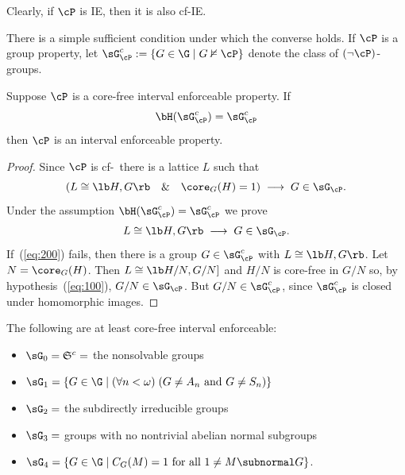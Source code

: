 \begin{frame}[label=IEPropsConverseLemma]{}
Clearly, if $\cP$ is IE, then it is also cf-IE.
\vskip4mm

There is a simple sufficient condition under which the converse holds.
\vskip4mm
If $\cP$ is a group property, let
$\sG_{\cP}^c := \{G\in \G \mid G\nvDash \cP\}$
denote the class of $(\neg \cP)$-groups.

\begin{lemma}
\label{lemma-wjd-2}
Suppose $\cP$ is a core-free interval enforceable property.  
If 
\[
\bH(\sG_{\cP}^c) = \sG_{\cP}^c
\]
then $\cP$ is an interval enforceable property.
\end{lemma}
\end{frame}

\begin{frame}[label=IEPropsProof]{}
\begin{proof}
Since $\cP$ is cf-\IE\ there is a lattice $L$ such that
\begin{equation}
  \label{eq:100}
\left(L \cong \lb H,G \rb \quad \& \quad \core_G(H)=1\right) \; \longrightarrow \; G\in \sG_\cP.
\end{equation}
Under the assumption $\bH(\sG_\cP^c) = \sG_\cP^c$ we prove
\begin{equation}
  \label{eq:200}
L \cong \lb H,G \rb \; \longrightarrow \; G\in \sG_\cP.
\end{equation}
If~(\ref{eq:200}) fails, then there is a
group $G\in \sG_{\cP}^c$ with $L\cong \lb H,G \rb$.  Let $N = \core_G(H)$.  Then $L \cong
\lb H/N,G/N]$ and $H/N$ is core-free in $G/N$ so, by hypothesis~(\ref{eq:100}),
$G/N \in \sG_\cP$.  But $G/N \in \sG_{\cP}^c$, since $\sG_{\cP}^c$ is closed under homomorphic images.
\end{proof}
\end{frame}

\begin{frame}[label=IEProps]{}
The following are at least core-free interval enforceable:
\vskip5mm
\begin{itemize}
\item $\sG_0 = \mathfrak{S}^c = $ the nonsolvable groups
\vskip2mm
\item $\sG_1 =\{G\in \G \mid (\forall n<\omega) \; (G \neq A_n \text{ and }  G\neq S_n) \}$
\vskip2mm
\item $\sG_2 = $ the subdirectly irreducible groups
\vskip2mm
\item $\sG_3 = $ groups with no nontrivial abelian normal subgroups
\vskip2mm
\item $\sG_4 = \{G\in \G \mid C_G(M) = 1 \text{ for all } 1\neq M\subnormal G\}$.
\end{itemize}
\end{frame}

